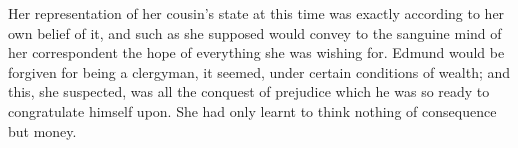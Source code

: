 Her representation of her cousin's state at this time was exactly according to her own belief of it, and such as she supposed would convey to the sanguine mind of her correspondent the hope of everything she was wishing for. Edmund would be forgiven for being a clergyman, it seemed, under certain conditions of wealth; and this, she suspected, was all the conquest of prejudice which he was so ready to congratulate himself upon. She had only learnt to think nothing of consequence but money. 
